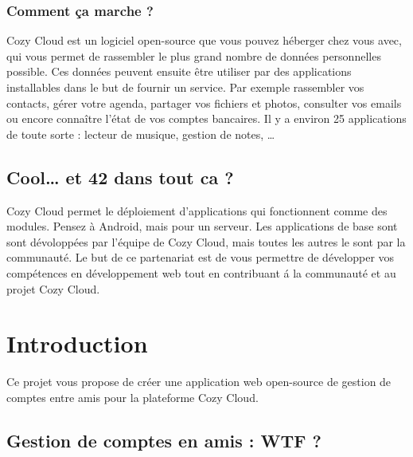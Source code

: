\documentclass{42-fr}
\begin{document}
		\subsection{Comment ça marche ?}

			Cozy Cloud est un logiciel open-source que vous pouvez h\'eberger chez vous
			avec, qui vous permet de rassembler le plus grand nombre de donn\'ees
			personnelles possible. Ces donn\'ees peuvent ensuite \^etre utiliser par des 
			applications installables dans le but de fournir un service. Par exemple
			rassembler vos contacts, g\'erer votre agenda, partager vos fichiers et 
			photos, consulter vos emails ou encore conna\^itre l'état de vos comptes
			bancaires. Il y a environ 25 applications de toute sorte : lecteur de musique,
			gestion de notes, …

	\section{Cool… et 42 dans tout ca ?}

		Cozy Cloud permet le déploiement d'applications qui fonctionnent comme
		des modules. Pensez à Android, mais pour un serveur. Les applications de 
		base sont sont d\'evolopp\'ees par l'équipe de Cozy Cloud, mais toutes 
		les autres le sont par la communaut\'e. Le but de ce partenariat est de vous
		permettre de d\'evelopper vos comp\'etences en d\'eveloppement web tout
		en contribuant \'a la communaut\'e  et au projet Cozy Cloud.


\chapter{Introduction}

	Ce projet vous propose de cr\'eer une application web open-source de gestion de
	comptes entre amis pour la plateforme Cozy Cloud.

	\section{Gestion de comptes en amis : WTF ?}
\end{document}
